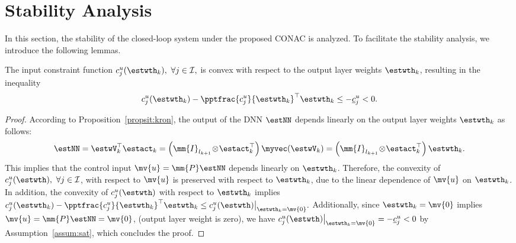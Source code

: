 \documentclass[letterpaper, journal]{IEEEtran}
\begin{document}
\section{Stability Analysis} \label{sec:stability:analysis}

In this section, the stability of the closed-loop system under the proposed CONAC is analyzed.
To facilitate the stability analysis, we introduce the following lemmas.

\begin{lem} \label{lem:convexity:input:constraint}
  The input constraint function $c_j^{u}(\estwth_k),\ \forall j \in \mathcal{I},$ is convex with respect to the output layer weights $\estwth_k$, resulting in the inequality 
  \begin{equation*}
    c_j^{u}(\estwth_k) 
    - 
    \pptfrac{c_j^{u}}{\estwth_k}^\top 
    \estwth_k 
    \le 
    - \underline{c}_j^{u}
    <
    0
    .
  \end{equation*}
\end{lem}

\begin{proof}
  According to Proposition~\ref{propsit:kron}, the output of the DNN $\estNN$ depends linearly on the output layer weights $\estwth_k$ as follows:
  \begin{equation} \label{eq:NN:linear}
    \estNN
    =
    \estwV_k^\top
    \estact_k
    = 
    \left(
      \mm{I}_{l_{k+1}}
      \!
      \otimes
      \! 
      \estact_k^\top
    \right)
    \myvec(\estwV_k)
    = 
    \left(
      \mm{I}_{l_{k+1}} 
      \!
      \otimes 
      \!
      \estact_k^\top
    \right)
    \estwth_k
    .
  \end{equation}
  This implies that the control input $\mv{u}=\mm{P}\estNN$ depends linearly on $\estwth_k$.
  Therefore, the convexity of $c_j^u(\estwth),\ \forall j \in \mathcal{I}$, with respect to $\mv{u}$ is preserved with respect to $\estwth_k$, due to the linear dependence of $\mv{u}$ on $\estwth_k$.
  In addition, the convexity of $c_j^u(\estwth)$ with respect to $\estwth_k$ implies 
  $
    c_j^{u}(\estwth_k) 
    - 
    \pptfrac{c_j^{u}}{\estwth_k}^\top 
    \estwth_k 
    \le 
    c_j^{u}(\estwth)\big|_{\estwth_k=\mv{0}}
    .
  $
  Additionally, since $\estwth_k=\mv{0}$ implies $\mv{u}=\mm{P}\estNN=\mv{0}$, (\ie output layer weight is zero), we have $c_j^{u}(\estwth)\big|_{\estwth_k=\mv{0}}=-\underline{c}_j^{u}<0$ by Assumption~\ref{assum:sat}, which concludes the proof.
\end{proof}
\end{document}
